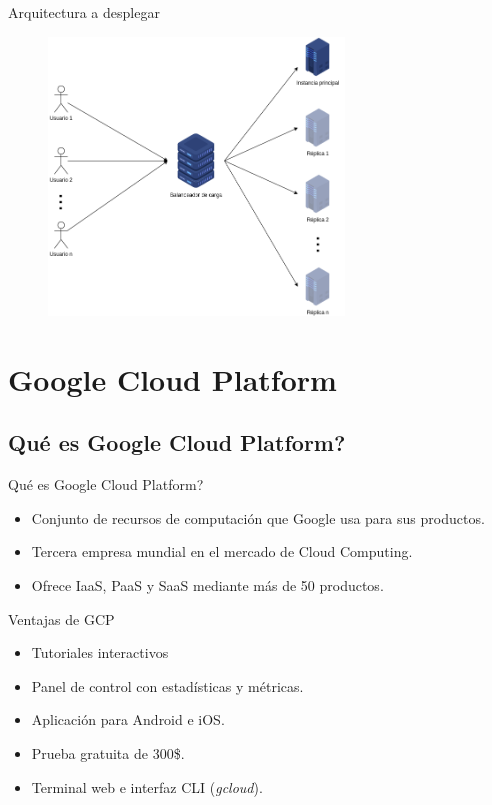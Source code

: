 \documentclass{beamer}
\begin{document}
\begin{frame}[fragile]{Arquitectura a desplegar}
  \begin{figure}[H]
    \centering
    \includegraphics[width =0.7\textwidth]{project/architecture.png}
  \end{figure}
\end{frame}

\section{Google Cloud Platform}

\subsection{Qué es Google Cloud Platform?}

\begin{frame}[fragile]{Qué es Google Cloud Platform?}
  \begin{itemize}[<+->]
    \item Conjunto de recursos de computación que Google usa para sus productos.
    \item Tercera empresa mundial en el mercado de Cloud Computing.
    \item Ofrece IaaS, PaaS y SaaS mediante más de 50 productos.
  \end{itemize}
\end{frame}


\begin{frame}[fragile]{Ventajas de GCP}
  \begin{itemize}[<+->]
    \item Tutoriales interactivos
    \item Panel de control con estadísticas y métricas.
    \item Aplicación para Android e iOS.
    \item Prueba gratuita de 300\$.
    \item Terminal web e interfaz CLI (\emph{gcloud}).
  \end{itemize}
\end{frame}
\end{document}
